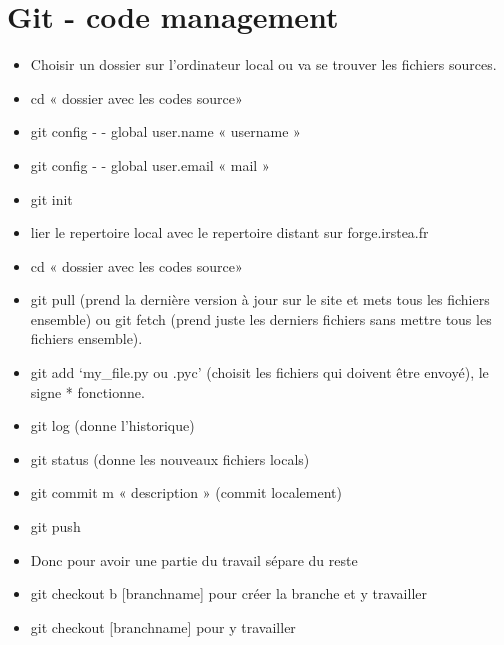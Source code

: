 \documentclass[letterpaper,10pt,english]{sphinxmanual}
\begin{document}
\section{Git - code management}
\label{\detokenize{index:git-code-management}}
\begin{itemize}
\item {} 
Choisir un dossier sur l’ordinateur local ou va se trouver les fichiers sources.

\item {} 
cd  « dossier avec les codes source»

\item {} 
git config - - global user.name « username »

\item {} 
git config - - global user.email  « mail »

\item {} 
git init

\item {} 
lier le repertoire local avec le repertoire distant sur forge.irstea.fr

\end{itemize}

\begin{itemize}
\item {} 
cd « dossier avec les codes source»

\item {} 
git pull (prend la dernière version à jour sur le site et mets tous les fichiers ensemble) ou git fetch (prend juste les derniers fichiers sans mettre tous les fichiers ensemble).

\item {} 
git add ‘my\_file.py ou .pyc’ (choisit les fichiers qui doivent être envoyé), le signe * fonctionne.

\item {} 
git log (donne l’historique)

\item {} 
git status (donne les nouveaux fichiers locals)

\item {} 
git commit \textendash{}m « description » (commit localement)

\item {} 
git push

\end{itemize}

\begin{itemize}
\item {} 
Donc pour avoir une partie du travail sépare du reste

\item {} 
git checkout \textendash{}b {[}branchname{]} pour créer la branche et y travailler

\item {} 
git checkout {[}branchname{]} pour y travailler

\end{itemize}
\end{document}
